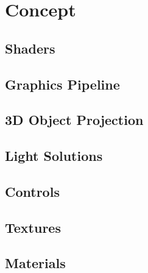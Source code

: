 \chapter{Concept}
\label{cha:Concept}

\section{Shaders}
\section{Graphics Pipeline}
\section{3D Object Projection}
\section{Light Solutions}
\section{Controls}
\section{Textures}
\section{Materials}